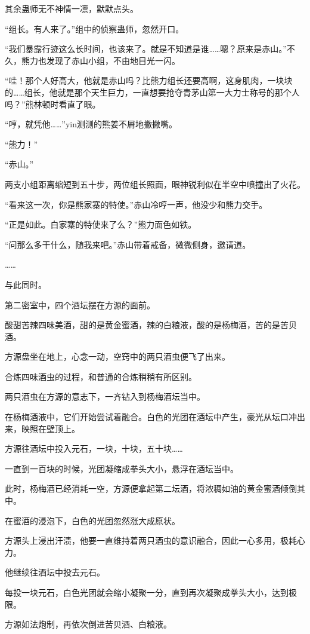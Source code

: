 \begin{this_body}
其余蛊师无不神情一凛，默默点头。

“组长。有人来了。”组中的侦察蛊师，忽然开口。

“我们暴露行迹这么长时间，也该来了。就是不知道是谁……嗯？原来是赤山。”不久，熊力也发现了赤山小组，不由地目光一闪。

“哇！那个人好高大，他就是赤山吗？比熊力组长还要高啊，这身肌肉，一块块的……组长，他就是那个天生巨力，一直想要抢夺青茅山第一大力士称号的那个人吗？”熊林顿时看直了眼。

“哼，就凭他……”yin测测的熊姜不屑地撇撇嘴。

“熊力！”

“赤山。”

两支小组距离缩短到五十步，两位组长照面，眼神锐利似在半空中喷撞出了火花。

“看来这一次，你是熊家寨的特使。”赤山冷哼一声，他没少和熊力交手。

“正是如此。白家寨的特使来了么？”熊力面色如铁。

“问那么多干什么，随我来吧。”赤山带着戒备，微微侧身，邀请道。

……

与此同时。

第二密室中，四个酒坛摆在方源的面前。

酸甜苦辣四味美酒，甜的是黄金蜜酒，辣的白粮液，酸的是杨梅酒，苦的是苦贝酒。

方源盘坐在地上，心念一动，空窍中的两只酒虫便飞了出来。

合炼四味酒虫的过程，和普通的合炼稍稍有所区别。

两只酒虫在方源的意志下，一齐钻入到杨梅酒坛当中。

在杨梅酒液中，它们开始尝试着融合。白色的光团在酒坛中产生，豪光从坛口冲出来，映照在壁顶上。

方源往酒坛中投入元石，一块，十块，五十块……

一直到一百块的时候，光团凝缩成拳头大小，悬浮在酒坛当中。

此时，杨梅酒已经消耗一空，方源便拿起第二坛酒，将浓稠如油的黄金蜜酒倾倒其中。

在蜜酒的浸泡下，白色的光团忽然涨大成原状。

方源头上浸出汗渍，他要一直维持着两只酒虫的意识融合，因此一心多用，极耗心力。

他继续往酒坛中投去元石。

每投一块元石，白色光团就会缩小凝聚一分，直到再次凝聚成拳头大小，达到极限。

方源如法炮制，再依次倒进苦贝酒、白粮液。


\end{this_body}
